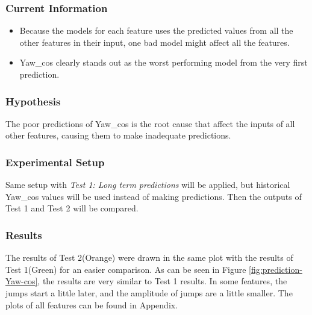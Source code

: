 \documentclass[12pt,twoside]{report}
\begin{document}
\subsubsection{Current Information}
\begin{itemize}
    \item Because the models for each feature uses the predicted values from all the other features in their input, one bad model might affect all the features.
    \item Yaw\_cos clearly stands out as the worst performing model from the very first prediction.
\end{itemize}

\subsubsection{Hypothesis}
The poor predictions of Yaw\_cos is the root cause that affect the inputs of all other features, causing them to make inadequate predictions.

\subsubsection{Experimental Setup}
Same setup with \textit{Test 1: Long term predictions} will be applied, but historical Yaw\_cos values will be used instead of making predictions. Then the outputs of Test 1 and Test 2 will be compared.

\subsubsection{Results}
The results of Test 2(Orange) were drawn in the same plot with the results of Test 1(Green) for an easier comparison. As can be seen in Figure \ref{fig:prediction-Yaw-cos}, the results are very similar to Test 1 results. In some features, the jumps start a little later, and the amplitude of jumps are a little smaller. The plots of all features can be found in Appendix.
\end{document}

